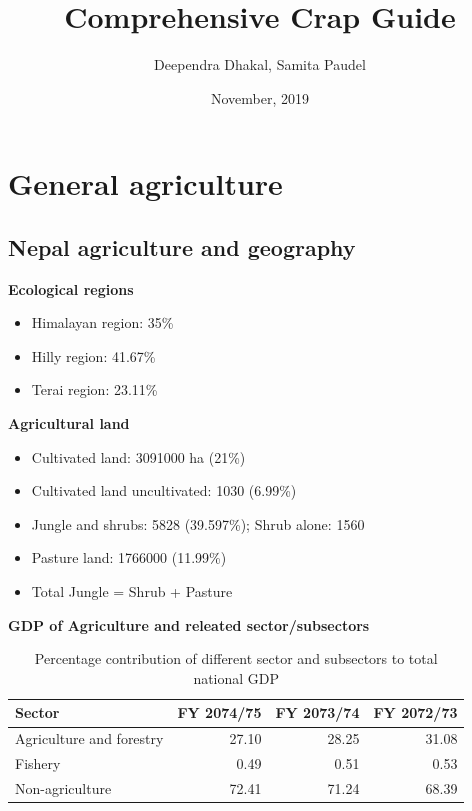 \documentclass[
  openany]{book}
\title{Comprehensive Crap Guide}
\author{Deependra Dhakal, Samita Paudel}
\date{November, 2019}
\providecommand{\tightlist}{%
  \setlength{\itemsep}{0pt}\setlength{\parskip}{0pt}}
\begin{document}
\maketitle

{
\setcounter{tocdepth}{1}
\tableofcontents
}
\hypertarget{general-agriculture}{%
\chapter{General agriculture}\label{general-agriculture}}

\hypertarget{nepal-agriculture-and-geography}{%
\section{Nepal agriculture and geography}\label{nepal-agriculture-and-geography}}

\textbf{Ecological regions}

\begin{itemize}
\tightlist
\item
  Himalayan region: 35\%
\item
  Hilly region: 41.67\%
\item
  Terai region: 23.11\%
\end{itemize}

\textbf{Agricultural land}

\begin{itemize}
\tightlist
\item
  Cultivated land: 3091000 ha (21\%)
\item
  Cultivated land uncultivated: 1030 (6.99\%)
\item
  Jungle and shrubs: 5828 (39.597\%); Shrub alone: 1560
\item
  Pasture land: 1766000 (11.99\%)
\item
  Total Jungle = Shrub + Pasture
\end{itemize}

\textbf{GDP of Agriculture and releated sector/subsectors}

\begin{table}

\caption{\label{tab:unnamed-chunk-2}Percentage contribution of different sector and subsectors to total national GDP}
\centering
\begin{tabular}[t]{lrrr}
\toprule
Sector & FY 2074/75 & FY 2073/74 & FY 2072/73\\
\midrule
\rowcolor{gray!6}  Agriculture and forestry & 27.10 & 28.25 & 31.08\\
Fishery & 0.49 & 0.51 & 0.53\\
\rowcolor{gray!6}  Non-agriculture & 72.41 & 71.24 & 68.39\\
\bottomrule
\end{tabular}
\end{table}
\end{document}
